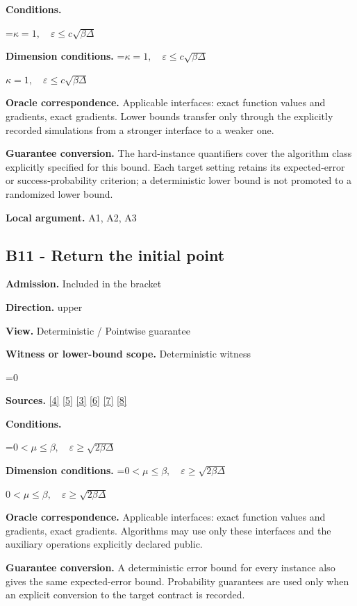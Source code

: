 \documentclass[10pt,a4paper]{article}
\newcommand{\AtlasMath}[1]{\par\begingroup\centering\setbox0=\hbox{$\displaystyle #1$}\ifdim\wd0>1.4\linewidth\typeout{ATLAS WIDE FORMULA: \the\wd0}\fi\ifdim\wd0>\linewidth\resizebox{\linewidth}{!}{\box0}\else\box0\fi\par\endgroup}
\newcommand{\AtlasInlineMath}[1]{\begingroup\setbox0=\hbox{$#1$}\ifdim\wd0>.4\linewidth\endgroup\AtlasMath{#1}\else\endgroup$#1$\fi}
\begin{document}
\textbf{Conditions.} 
\AtlasMath{\kappa=1,\quad\varepsilon\le c\sqrt{\beta\Delta}}


\textbf{Dimension conditions.} \AtlasInlineMath{\kappa=1,\quad\varepsilon\le c\sqrt{\beta\Delta}}

\textbf{Oracle correspondence.} Applicable interfaces: exact function values and gradients, exact gradients. Lower bounds transfer only through the explicitly recorded simulations from a stronger interface to a weaker one.

\textbf{Guarantee conversion.} The hard-instance quantifiers cover the algorithm class explicitly specified for this bound. Each target setting retains its expected-error or success-probability criterion; a deterministic lower bound is not promoted to a randomized lower bound.

\textbf{Local argument.} A1, A2, A3

\subsection{B11 - Return the initial point}
\textbf{Admission.} Included in the bracket

\textbf{Direction.} upper

\textbf{View.} Deterministic / Pointwise guarantee

\textbf{Witness or lower-bound scope.} Deterministic witness

\AtlasMath{0}
\textbf{Sources.} \href{https://arxiv.org/pdf/2101.09740v2}{[4]} \href{https://arxiv.org/pdf/2609.33360v2}{[5]} \href{https://arxiv.org/pdf/2609.10874}{[3]} \href{https://arxiv.org/pdf/1405.4980}{[6]} \href{https://www2.isye.gatech.edu/~nemirovs/MOR_AccuracyCertificates.pdf}{[7]} \href{https://arxiv.org/pdf/2609.20701}{[8]}

\textbf{Conditions.} 
\AtlasMath{0<\mu\le\beta,\quad\varepsilon\ge\sqrt{2\beta\Delta}}


\textbf{Dimension conditions.} \AtlasInlineMath{0<\mu\le\beta,\quad\varepsilon\ge\sqrt{2\beta\Delta}}

\textbf{Oracle correspondence.} Applicable interfaces: exact function values and gradients, exact gradients. Algorithms may use only these interfaces and the auxiliary operations explicitly declared public.

\textbf{Guarantee conversion.} A deterministic error bound for every instance also gives the same expected-error bound. Probability guarantees are used only when an explicit conversion to the target contract is recorded.
\end{document}

